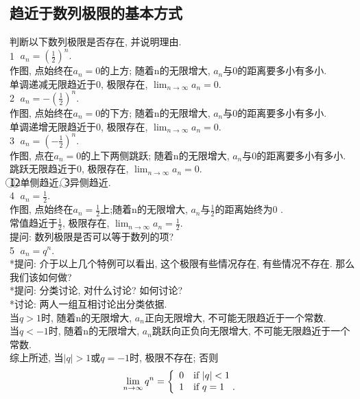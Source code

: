 \documentclass{article}
\begin{document}
\begin{CJK}{UTF8}{gkai}
\subsection{趋近于数列极限的基本方式}
判断以下数列极限是否存在, 并说明理由.\\
\textcircled{1} $a_n = (\frac{1}{2})^n.$\\
作图, 点始终在$a_n = 0$的上方; 随着n的无限增大, $a_n$与0的距离要多小有多小.\\
单调递减无限趋近于0, 极限存在, $\lim_{n \to \infty}{a_n} = 0.$\\
\newline
\textcircled{2} $a_n = -(\frac{1}{2})^n.$\\
作图, 点始终在$a_n = 0$的下方; 随着n的无限增大, $a_n$与0的距离要多小有多小.\\
单调递增无限趋近于0, 极限存在, $\lim_{n \to \infty}{a_n} = 0.$\\
\newline
\textcircled{3} $a_n = (-\frac{1}{2})^n.$\\
作图, 点在$a_n = 0$的上下两侧跳跃; 随着n的无限增大, $a_n$与0的距离要多小有多小.\\
跳跃无限趋近于0, 极限存在, $\lim_{n \to \infty}{a_n} = 0.$\\
\newline
\textcircled{1}\textcircled{2}单侧趋近, \textcircled{3}异侧趋近.\\
\newline
\textcircled{4} $a_n = \frac{1}{2}.$\\
作图, 点始终在$a_n =  \frac{1}{2}$上;随着n的无限增大, $a_n$与$\frac{1}{2}$的距离始终为0 .\\
常值趋近于$\frac{1}{2}$, 极限存在, $\lim_{n \to \infty}{a_n} = \frac{1}{2}.$\\
\newline*提问: 数列极限是否可以等于数列的项?\\
\textcircled{5} $a_n = q^n.$\\
*提问: 介于以上几个特例可以看出, 这个极限有些情况存在, 有些情况不存在. 那么我们该如何做?\\
*提问: 分类讨论, 对什么讨论? 如何讨论?\\
*讨论: 两人一组互相讨论出分类依据.\\
当$q > 1$时, 随着n的无限增大, $a_n$正向无限增大, 不可能无限趋近于一个常数.\\
当$q < -1$时, 随着n的无限增大, $a_n$跳跃向正负向无限增大, 不可能无限趋近于一个常数.\\
\newline
综上所述, 当$|q| > 1$或$q = -1$时, 极限不存在; 否则 \\
\begin{displaymath}
\lim_{n \to \infty}{q^n} = \left\{ \begin{array}{ll}
 0 & \textrm{if $|q| < 1$}\\
 1 & \textrm{if $q = 1$}\hspace{3mm}.\\
  \end{array} \right.
\end{displaymath}


\end{CJK}
\end{document}
